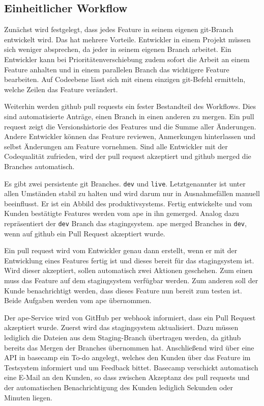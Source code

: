 
\subsection{Einheitlicher Workflow} %
\label{sub:einheitlicher_workflow}

Zunächst wird festgelegt, dass jedes Feature in seinem eigenen \gls{git}-Branch entwickelt wird. Das hat mehrere Vorteile. Entwickler in einem Projekt müssen sich weniger absprechen, da jeder in seinem eigenen Branch arbeitet. Ein Entwickler kann bei Prioritätenverschiebung zudem sofort die Arbeit an einem Feature anhalten und in einem parallelen Branch das wichtigere Feature bearbeiten. Auf Codeebene lässt sich mit einem einzigen \gls{git}-Befehl ermitteln, welche Zeilen das Feature verändert.

Weiterhin werden \gls{github} \glspl{pull request} ein fester Bestandteil des Workflows. Dies sind automatisierte Anträge, einen Branch in einen anderen zu mergen. Ein \gls{pull request} zeigt die Versionshistorie des Features und die Summe aller Änderungen. Andere Entwickler können das Feature reviewen, Anmerkungen hinterlassen und selbst Änderungen am Feature vornehmen. Sind alle Entwickler mit der Codequalität zufrieden, wird der \gls{pull request} akzeptiert und \gls{github} merged die Branches automatisch.

Es gibt zwei persistente \gls{git} Branches. \lstinline!dev! und \lstinline!live!. Letztgenannter ist unter allen Umständen stabil zu halten und wird darum nur in Ausnahmefällen manuell beeinflusst. Er ist ein Abbild des \gls{produktivsystem}s. Fertig entwickelte und vom Kunden bestätigte Features werden vom \gls{ape} in ihn gemerged. Analog dazu repräsentiert der \lstinline!dev! Branch das \gls{stagingsystem}. \gls{ape} merged Branches in \lstinline!dev!, wenn auf \gls{github} ein Pull Request akzeptiert wurde.

Ein \gls{pull request} wird vom Entwickler genau dann erstellt, wenn er mit der Entwicklung eines Features fertig ist und dieses bereit für das \gls{stagingsystem} ist. Wird dieser akzeptiert, sollen automatisch zwei Aktionen geschehen. Zum einen muss das Feature auf dem \gls{stagingsystem} verfügbar werden. Zum anderen soll der Kunde benachrichtigt werden, dass dieses Feature nun bereit zum testen ist. Beide Aufgaben werden vom \gls{ape} übernommen.

Der \gls{ape}-Service wird von GitHub per \Gls{webhook} informiert, dass ein Pull Request akzeptiert wurde. Zuerst wird das \gls{stagingsystem} aktualisiert. Dazu müssen lediglich die Dateien aus dem Staging-Branch übertragen werden, da \gls{github} bereits das Mergen der Branches übernommen hat. Anschließend wird über eine API in \gls{basecamp} ein To-do angelegt, welches den Kunden über das Feature im Testsystem informiert und um Feedback bittet. Basecamp verschickt automatisch eine E-Mail an den Kunden, so dass zwischen Akzeptanz des \glspl{pull request} und der automatischen Benachrichtigung des Kunden lediglich Sekunden oder Minuten liegen.

